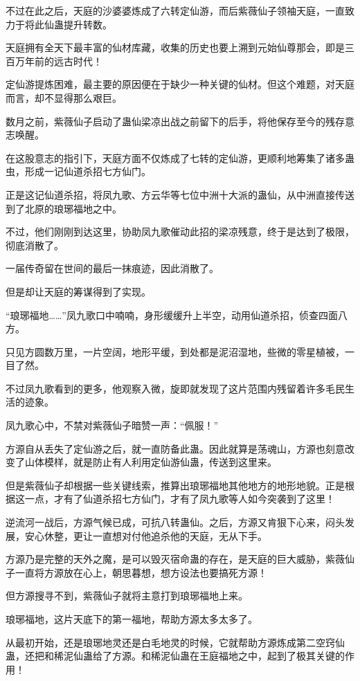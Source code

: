 \begin{this_body}
不过在此之后，天庭的沙婆婆炼成了六转定仙游，而后紫薇仙子领袖天庭，一直致力于将此仙蛊提升转数。

天庭拥有全天下最丰富的仙材库藏，收集的历史也要上溯到元始仙尊那会，即是三百万年前的远古时代！

定仙游提炼困难，最主要的原因便在于缺少一种关键的仙材。但这个难题，对天庭而言，却不显得那么艰巨。

数月之前，紫薇仙子启动了蛊仙梁凉出战之前留下的后手，将他保存至今的残存意志唤醒。

在这股意志的指引下，天庭方面不仅炼成了七转的定仙游，更顺利地筹集了诸多蛊虫，形成一记仙道杀招七方仙门。

正是这记仙道杀招，将凤九歌、方云华等七位中洲十大派的蛊仙，从中洲直接传送到了北原的琅琊福地之中。

不过，他们刚刚到达这里，协助凤九歌催动此招的梁凉残意，终于是达到了极限，彻底消散了。

一届传奇留在世间的最后一抹痕迹，因此消散了。

但是却让天庭的筹谋得到了实现。

“琅琊福地……”凤九歌口中喃喃，身形缓缓升上半空，动用仙道杀招，侦查四面八方。

只见方圆数万里，一片空阔，地形平缓，到处都是泥沼湿地，些微的零星植被，一目了然。

不过凤九歌看到的更多，他观察入微，旋即就发现了这片范围内残留着许多毛民生活的迹象。

凤九歌心中，不禁对紫薇仙子暗赞一声：“佩服！”

方源自从丢失了定仙游之后，就一直防备此蛊。因此就算是荡魂山，方源也刻意改变了山体模样，就是防止有人利用定仙游仙蛊，传送到这里来。

但是紫薇仙子却根据一些关键线索，推算出琅琊福地其他地方的地形地貌。正是根据这一点，才有了仙道杀招七方仙门，才有了凤九歌等人如今突袭到了这里！

逆流河一战后，方源气候已成，可抗八转蛊仙。之后，方源又肯狠下心来，闷头发展，安心休整，更让一直想对付他追杀他的天庭，无从下手。

方源乃是完整的天外之魔，是可以毁灭宿命蛊的存在，是天庭的巨大威胁，紫薇仙子一直将方源放在心上，朝思暮想，想方设法也要搞死方源！

但方源搜寻不到，紫薇仙子就将主意打到琅琊福地上来。

琅琊福地，这片天底下的第一福地，帮助方源太多太多了。

从最初开始，还是琅琊地灵还是白毛地灵的时候，它就帮助方源炼成第二空窍仙蛊，还把和稀泥仙蛊给了方源。和稀泥仙蛊在王庭福地之中，起到了极其关键的作用！


\end{this_body}

